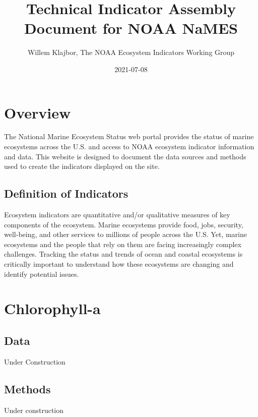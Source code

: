\documentclass[
]{book}
\title{Technical Indicator Assembly Document for NOAA NaMES}
\author{Willem Klajbor, The NOAA Ecosystem Indicators Working Group}
\date{2021-07-08}
\begin{document}
\maketitle

{
\setcounter{tocdepth}{1}
\tableofcontents
}
\hypertarget{overview}{%
\chapter*{Overview}\label{overview}}

The National Marine Ecosystem Status web portal provides the status of marine ecosystems across the U.S. and access to NOAA ecosystem indicator information and data. This website is designed to document the data sources and methods used to create the indicators displayed on the site.

\hypertarget{definition-of-indicators}{%
\section{Definition of Indicators}\label{definition-of-indicators}}

Ecosystem indicators are quantitative and/or qualitative measures of key components of the ecosystem. Marine ecosystems provide food, jobs, security, well-being, and other services to millions of people across the U.S. Yet, marine ecosystems and the people that rely on them are facing increasingly complex challenges. Tracking the status and trends of ocean and coastal ecosystems is critically important to understand how these ecosystems are changing and identify potential issues.

\hypertarget{chlorophyll-a}{%
\chapter{Chlorophyll-a}\label{chlorophyll-a}}

\hypertarget{data}{%
\section{Data}\label{data}}

Under Construction

\hypertarget{methods}{%
\section{Methods}\label{methods}}

Under construction
\end{document}
